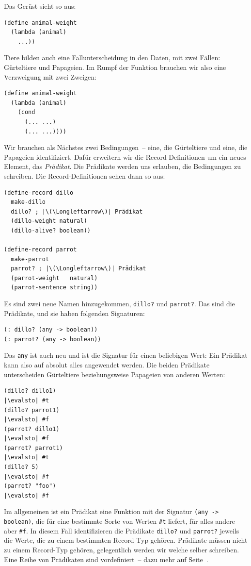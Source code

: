 %
Das Gerüst sieht so aus:
%
\begin{lstlisting}
(define animal-weight
  (lambda (animal)
    ...))
\end{lstlisting}
%
Tiere bilden auch eine Fallunterscheidung in den Daten, mit zwei
Fällen: Gürteltiere und Papageien.  Im Rumpf der Funktion brauchen wir
also eine Verzweigung mit zwei Zweigen:
%
\begin{lstlisting}
(define animal-weight
  (lambda (animal)
    (cond
      (... ...)
      (... ...))))
\end{lstlisting}
%
Wir brauchen als Nächstes zwei Bedingungen~-- eine, die Gürteltiere
und eine, die Papageien identifiziert.  Dafür erweitern wir die
Record-Definitionen um ein neues Element, das \textit{Prädikat}.
Die Prädikate werden uns erlauben, die Bedingungen zu
schreiben.  Die Record-Definitionen sehen dann so aus:
%
\begin{lstlisting}
(define-record dillo
  make-dillo
  dillo? ; |\(\Longleftarrow\)| Prädikat
  (dillo-weight natural)
  (dillo-alive? boolean))

(define-record parrot
  make-parrot
  parrot? ; |\(\Longleftarrow\)| Prädikat
  (parrot-weight   natural)
  (parrot-sentence string))
\end{lstlisting}
%
Es sind zwei neue Namen hinzugekommen, \lstinline{dillo?} und
\lstinline{parrot?}. Das sind die Prädikate, und sie haben folgenden
Signaturen:
%
\begin{lstlisting}
(: dillo? (any -> boolean))
(: parrot? (any -> boolean))
\end{lstlisting}
%
Das \lstinline{any} ist auch neu und ist die Signatur für einen
beliebigen Wert: Ein Prädikat kann also auf absolut alles angewendet
werden.  Die beiden Prädikate unterscheiden Gürteltiere
beziehungsweise Papageien von anderen Werten:
%
\begin{lstlisting}
(dillo? dillo1)
|\evalsto| #t
(dillo? parrot1)
|\evalsto| #f
(parrot? dillo1)
|\evalsto| #f
(parrot? parrot1)
|\evalsto| #t
(dillo? 5)
|\evalsto| #f
(parrot? "foo")
|\evalsto| #f
\end{lstlisting}
%
Im allgemeinen ist ein Prädikat eine Funktion mit der Signatur
\lstinline{(any -> boolean)}, die für eine bestimmte Sorte von Werten
\lstinline{#t} liefert, für alles andere aber \lstinline{#f}.  In
diesem Fall identifizieren die Prädikate \lstinline{dillo?}
und \lstinline{parrot?} jeweils die Werte, die zu einem bestimmten
Record-Typ gehören.  Prädikate müssen nicht zu einem Record-Typ
gehören, gelegentlich werden wir welche selber schreiben.  
Eine Reihe von Prädikaten sind vordefiniert~-- dazu mehr 
auf Seite~\pageref{scheme:predicates}.

